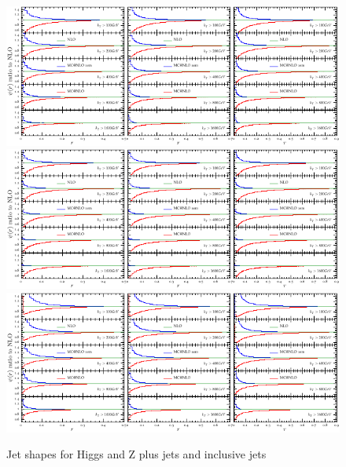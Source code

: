 \documentclass[aps,prd,onecolumn,fleqn,superscriptaddress,groupedaddress,nofootinbib,preprintnumbers,nobalancelastpage]{revtex4}
\begin{document}
\begin{figure}
\includegraphics[width=\textwidth]{plots/shapes/hj/hjshapes-crop.pdf}\\
\includegraphics[width=\textwidth]{plots/shapes/zj/zjshapes-crop.pdf}\\
\includegraphics[width=\textwidth]{plots/shapes/jj/jjshapes-crop.pdf}
\caption{Jet shapes for Higgs and Z plus jets and inclusive jets}
\end{figure}


\end{document}
